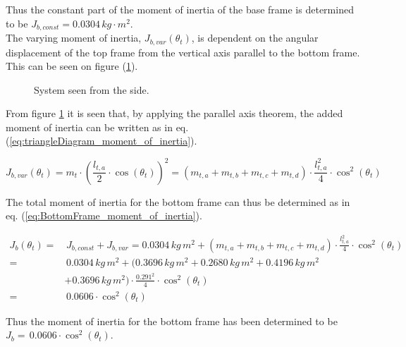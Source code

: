 \documentclass[../../main]{subfiles}
\begin{document}
Thus the constant part of the moment of inertia of the base frame is determined to be $J_{b,const} = 0.0304 \si{\,kg\cdot m^2}$.\\
The varying moment of inertia, $J_{b,var}(\theta_t)$, is dependent on the angular displacement of the top frame from the vertical axis parallel to the bottom frame. This can be seen on figure (\ref{fig:TrekantDiagram}).

\begin{figure}[H]
  \centering
  \def\svgwidth{0.4\columnwidth}
  
  \caption{System seen from the side.}
  \label{fig:TrekantDiagram}
\end{figure}

From figure \ref{fig:TrekantDiagram} it is seen that, by applying the parallel axis theorem, the added moment of inertia can be written as in eq. (\ref{eq:triangleDiagram_moment_of_inertia}).

\begin{equation}
  \label{eq:triangleDiagram_moment_of_inertia}
  J_{b,var}(\theta_t) = m_{t} \cdot \left( \frac{l_{t,a}}{2} \cdot \cos(\theta_t) \right)^2 = ( m_{t,a} + m_{t,b} + m_{t,c} + m_{t,d} ) \cdot \frac{l_{t,a}^2}{4} \cdot \cos^2(\theta_t)
\end{equation}

The total moment of inertia for the bottom frame can thus be determined as in eq. (\ref{eq:BottomFrame_moment_of_inertia}).

\begin{equation}
  \label{eq:BottomFrame_moment_of_inertia}
\begin{split}
    J_{b}(\theta_t) =& \, J_{b,const} + J_{b,var} = 0.0304 \si{\, kg \, m^2} + ( m_{t,a} + m_{t,b} + m_{t,c} + m_{t,d} ) \cdot \frac{l_{t,a}^2}{4} \cdot \cos^2(\theta_t)\\
    =& \, 0.0304 \si{\, kg \, m^2} + ( 0.3696 \si{\, kg \, m^2} + 0.2680 \si{\, kg \, m^2} + 0.4196 \si{\, kg \, m^2}\\
    &+ 0.3696 \si{\, kg \, m^2}) \cdot \frac{0.291^2}{4} \cdot \cos^2(\theta_t)\\
    =& \, 0.0606\cdot \cos^2(\theta_t)
\end{split}
\end{equation}

Thus the moment of inertia for the bottom frame has been determined to be
\newline $J_{b} = \, 0.0606 \cdot \cos^2(\theta_t)$.
\end{document}
